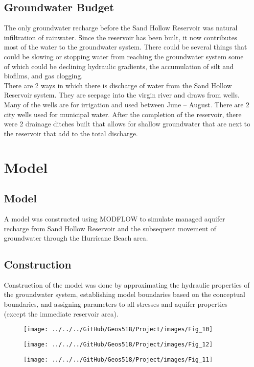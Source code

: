 \documentclass[]{report}
\begin{document}
 \subsection{Groundwater Budget}
The only groundwater recharge before the Sand Hollow Reservoir was natural infiltration of rainwater. Since the reservoir has been built, it now contributes most of the water to the groundwater system. There could be several things that could be slowing or stopping water from reaching the groundwater system some of which could be declining hydraulic gradients, the accumulation of silt and biofilms, and gas clogging.\\
  
There are 2 ways in which there is discharge of water from the Sand Hollow Reservoir system. They are seepage into the virgin river and draws from wells. Many of the wells are for irrigation and used between June – August. There are 2 city wells used for municipal water. After the completion of the reservoir, there were 2 drainage ditches built that allows for shallow groundwater that are next to the reservoir that add to the total discharge.\\
\section{Model}
\subsection{Model}
A model was constructed using MODFLOW to simulate managed aquifer recharge from Sand Hollow Reservoir and the subsequent movement of groundwater through the Hurricane Beach area.

\subsection{Construction}
Construction of the model was done by approximating the hydraulic properties of the groundwater system, establishing model boundaries based on the conceptual boundaries, and assigning parameters to all stresses and aquifer properties (except the immediate reservoir area).
\begin{figure}[h]
	\centering
	\begin{minipage}{0.4\textwidth}
		\texttt{[image: ../../../GitHub/Geos518/Project/images/Fig\_10]}
	\end{minipage}
	\hfill
	\begin{minipage}{0.4\textwidth}
		\texttt{[image: ../../../GitHub/Geos518/Project/images/Fig\_12]}
	\end{minipage}
\end{figure}
\begin{figure}[h]
	\centering
	\texttt{[image: ../../../GitHub/Geos518/Project/images/Fig\_11]}
\end{figure}
\end{document}
